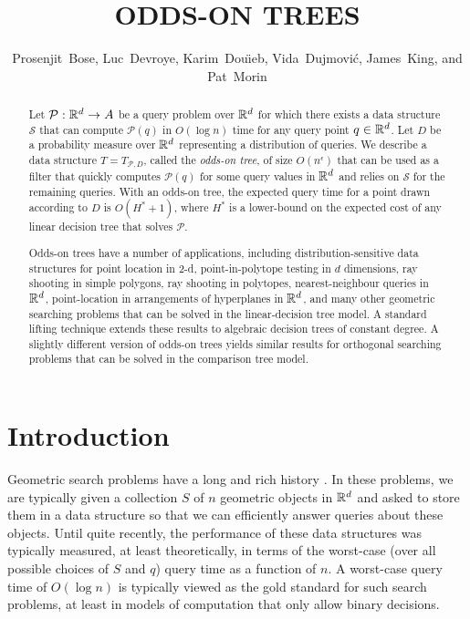 \documentclass{patmorin}
\title{\MakeUppercase{Odds-On Trees}}
\author{Prosenjit~Bose, 
        Luc~Devroye,
	Karim~Dou\"{\i}eb, 
	Vida~Dujmovi\'c, 
	James~King, and 
	Pat~Morin}
\newcommand{\eps}{\epsilon}
\begin{document}
\maketitle

\begin{abstract}
  Let $\mathcal{P}:\mathbb{R}^d\rightarrow A$ be a query problem over $\mathbb{R}^d$
  for which there exists a data structure $\mathcal{S}$ that can compute
  $\mathcal{P}(q)$ in $O(\log n)$ time for any query point $q\in\mathbb{R}^d$.
  Let $D$ be a probability measure over $\mathbb{R}^d$ representing a distribution
  of queries.  We describe a data structure $T=T_{\mathcal{P},D}$, called
  the \emph{odds-on tree}, of size $O(n^\eps)$ that can be used as a
  filter that quickly computes $\mathcal{P}(q)$ for some query values in
  $\mathbb{R}^d$ and relies on $\mathcal{S}$ for the remaining queries.  With an
  odds-on tree, the expected query time for a point drawn according to
  $D$ is $O(H^*+1)$, where $H^*$ is a lower-bound on the expected cost
  of any linear decision tree that solves $\mathcal{P}$.

  Odds-on trees have a number of applications, including
  distribution-sensitive data structures for point location in 2-d,
  point-in-polytope testing in $d$ dimensions, ray shooting in simple
  polygons, ray shooting in polytopes, nearest-neighbour queries in
  $\mathbb{R}^d$, point-location in arrangements of hyperplanes in $\mathbb{R}^d$,
  and many other geometric searching problems that can be solved in the
  linear-decision tree model.  A standard lifting technique extends these
  results to algebraic decision trees of constant degree.  A slightly
  different version of odds-on trees yields similar results for orthogonal
  searching problems that can be solved in the comparison tree model.
\end{abstract}

\section{Introduction}

Geometric search problems have a long and rich history
\cite{ae99,g00chapter,ms05}. In these problems, we are typically
given a collection $S$ of $n$ geometric objects in $\mathbb{R}^d$ and asked
to store them in a data structure so that we can efficiently answer
queries about these objects. Until quite recently, the performance of
these data structures was typically measured, at least theoretically,
in terms of the worst-case (over all possible choices of $S$ and $q$)
query time as a function of $n$.  A worst-case query time of $O(\log
n)$ is typically viewed as the gold standard for such search problems,
at least in models of computation that only allow binary decisions.
\end{document}
